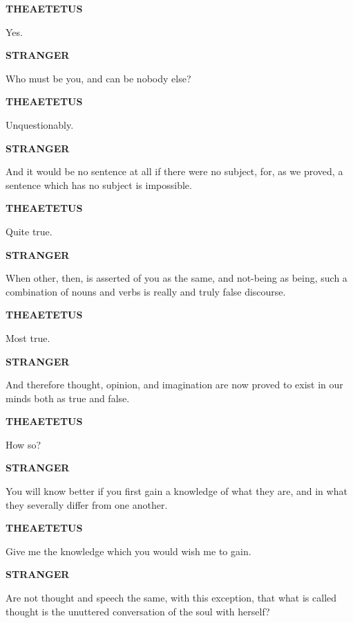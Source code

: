 \documentclass[11pt,letter]{article}
\begin{document}
\par \textbf{THEAETETUS}
\par   Yes.

\par \textbf{STRANGER}
\par   Who must be you, and can be nobody else?

\par \textbf{THEAETETUS}
\par   Unquestionably.

\par \textbf{STRANGER}
\par   And it would be no sentence at all if there were no subject, for, as we proved, a sentence which has no subject is impossible.

\par \textbf{THEAETETUS}
\par   Quite true.

\par \textbf{STRANGER}
\par   When other, then, is asserted of you as the same, and not-being as being, such a combination of nouns and verbs is really and truly false discourse.

\par \textbf{THEAETETUS}
\par   Most true.

\par \textbf{STRANGER}
\par   And therefore thought, opinion, and imagination are now proved to exist in our minds both as true and false.

\par \textbf{THEAETETUS}
\par   How so?

\par \textbf{STRANGER}
\par   You will know better if you first gain a knowledge of what they are, and in what they severally differ from one another.

\par \textbf{THEAETETUS}
\par   Give me the knowledge which you would wish me to gain.

\par \textbf{STRANGER}
\par   Are not thought and speech the same, with this exception, that what is called thought is the unuttered conversation of the soul with herself?
\end{document}
